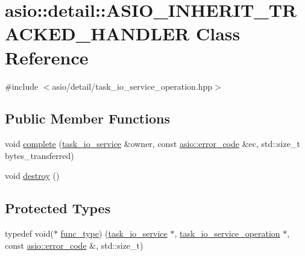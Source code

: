 \hypertarget{classasio_1_1detail_1_1_a_s_i_o___i_n_h_e_r_i_t___t_r_a_c_k_e_d___h_a_n_d_l_e_r}{}\section{asio\+:\+:detail\+:\+:A\+S\+I\+O\+\_\+\+I\+N\+H\+E\+R\+I\+T\+\_\+\+T\+R\+A\+C\+K\+E\+D\+\_\+\+H\+A\+N\+D\+L\+E\+R Class Reference}
\label{classasio_1_1detail_1_1_a_s_i_o___i_n_h_e_r_i_t___t_r_a_c_k_e_d___h_a_n_d_l_e_r}


{\ttfamily \#include $<$asio/detail/task\+\_\+io\+\_\+service\+\_\+operation.\+hpp$>$}

\subsection*{Public Member Functions}
\begin{DoxyCompactItemize}
\item 
void \hyperlink{classasio_1_1detail_1_1_a_s_i_o___i_n_h_e_r_i_t___t_r_a_c_k_e_d___h_a_n_d_l_e_r_a09c3bd20d61f5b857eabe986e0e4f9fa}{complete} (\hyperlink{classasio_1_1detail_1_1task__io__service}{task\+\_\+io\+\_\+service} \&owner, const \hyperlink{classasio_1_1error__code}{asio\+::error\+\_\+code} \&ec, std\+::size\+\_\+t bytes\+\_\+transferred)
\item 
void \hyperlink{classasio_1_1detail_1_1_a_s_i_o___i_n_h_e_r_i_t___t_r_a_c_k_e_d___h_a_n_d_l_e_r_a7384f192052e719cb1f0db1a7727ae36}{destroy} ()
\end{DoxyCompactItemize}
\subsection*{Protected Types}
\begin{DoxyCompactItemize}
\item 
typedef void($\ast$ \hyperlink{classasio_1_1detail_1_1_a_s_i_o___i_n_h_e_r_i_t___t_r_a_c_k_e_d___h_a_n_d_l_e_r_a424de9363d10315aa1db285d51219500}{func\+\_\+type}) (\hyperlink{classasio_1_1detail_1_1task__io__service}{task\+\_\+io\+\_\+service} $\ast$, \hyperlink{classasio_1_1detail_1_1_a_s_i_o___i_n_h_e_r_i_t___t_r_a_c_k_e_d___h_a_n_d_l_e_r_a1e458b6f5eadbe2c7a47bfb228979f90}{task\+\_\+io\+\_\+service\+\_\+operation} $\ast$, const \hyperlink{classasio_1_1error__code}{asio\+::error\+\_\+code} \&, std\+::size\+\_\+t)
\end{DoxyCompactItemize}
